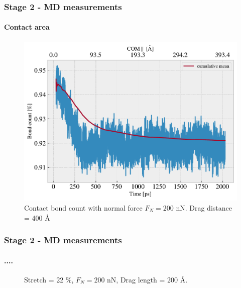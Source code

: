 \documentclass[
	10pt, %
]{beamer}
\begin{document}
\begin{frame}
	\frametitle{Stage 2 - MD measurements}
	\framesubtitle{Contact area}

	
	\begin{figure}
		\includegraphics[width=0.7\linewidth]{figures/contact2.pdf}
		\caption{Contact bond count with normal force $F_N = 200$ nN. Drag distance = 400 Å}
	\end{figure}	
	
\end{frame}


\begin{frame}
	\frametitle{Stage 2 - MD measurements}
	\framesubtitle{....}


	\begin{figure}
		\centering    
		\caption{Stretch = 22 \%, $F_N = 200$ nN, Drag length = 200 Å.}
   \end{figure} 

\end{frame}
\end{document}

